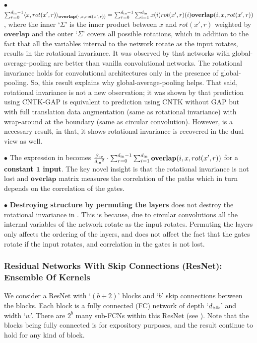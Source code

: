 $\bullet$ $\sum_{r=0}^{d_{\text{in}}-1} \langle x,rot(x',r)\rangle_{\textbf{overlap}(\cdot, x,rot(x',r))}=\sum_{r=0}^{d_{\text{in}}-1}\sum_{i=1}^{d_{\text{in}}} x(i) rot(x',r)(i)\textbf{overlap}(i,x,rot(x',r))$, where the inner `$\Sigma$' is the inner product between $x$ and $rot(x',r)$ weighted by $\textbf{overlap}$ and the outer `$\Sigma$' covers all possible rotations, which in addition to the fact that all the variables internal to the network rotate as the input rotates, results in the rotational invariance.  It was observed by \cite{arora2019exact} that networks with global-average-pooling are better than vanilla convolutional networks. The rotational invariance holds for convolutional architectures only in the presence of global-pooling.  So, this result explains why global-average-pooling helps. That said, rotational invariance is not a new observation; it was shown by \cite{li2019enhanced} that  prediction using CNTK-GAP is equivalent to prediction using CNTK without GAP but with full translation data augmentation  (same as rotational invariance) with wrap-around at the boundary (same as circular convolution). However,  is a necessary result, in that, it shows rotational invariance is recovered in the dual view as well. 

$\bullet$ The expression in  becomes $\frac{\beta_{\text{cv}}}{{d_{\text{in}}}^2} \cdot \sum_{r=0}^{d_{\text{in}}-1}\sum_{i=1}^{d_{\text{in}}} \textbf{overlap}(i,x,rot(x',r))$  for a \textbf{constant $\mathbf{1}$ input}. The key novel insight is that the rotational invariance is not lost and $\textbf{overlap}$ matrix measures the correlation of the paths which in turn depends on the correlation of the gates.

$\bullet$ \textbf{Destroying structure by permuting the layers} does not destroy the rotational invariance in . This is because, due to circular convolutions all the internal variables of the network rotate as the input rotates. Permuting the layers only affects the ordering of the layers, and does not affect the fact that the gates rotate if the input rotates, and correlation in the gates is not lost.

\subsubsection{Residual Networks With Skip Connections (ResNet): Ensemble Of Kernels}
We consider a ResNet with `$(b+2)$' blocks and `$b$' skip connections between the blocks. Each block is a fully connected (FC) network of depth `$d_{\text{blk}}$' and width `$w$'. There are $2^b$ many sub-FCNs within this ResNet (see ).
Note that the blocks being fully connected is for expository purposes, and the result continue to hold for any kind of block.

